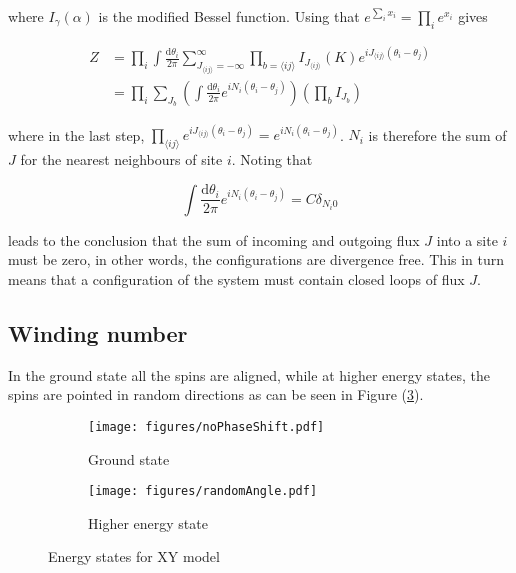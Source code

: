 where $I_\gamma(\alpha)$ is the modified Bessel function. Using that $e^{\sum_i x_i} = \prod_i e^{x_i}$ gives

\begin{align}
    Z &= \prod_i \int \frac{\mathrm d \theta_i}{2 \pi} \sum_{J_{\langle ij \rangle} = -\infty}^{\infty} \prod_{b = \langle ij \rangle} I_{J_{\langle ij \rangle}} ( K ) e^{i J_{\langle ij \rangle} (\theta_i - \theta_j)} \\
\label{eq:xypart2}
% 
    &=  \prod_i \sum_{J_b} \left ( \int \frac{\mathrm d \theta_i}{2 \pi} e^{i N_i (\theta_i - \theta_j)} \right ) \left ( \prod_b I_{J_b} \right ) 
\end{align}

where in the last step, $\prod_{\langle ij \rangle} e^{iJ_{\langle ij \rangle} (\theta_i - \theta_j)} = e^{iN_i (\theta_i - \theta_j)}$. $N_i$ is therefore the sum of $J$ for the nearest neighbours of site $i$. Noting that

\begin{equation}
    \int \frac{\mathrm d \theta_i}{2 \pi} e^{i N_i (\theta_i - \theta_j)} = C \delta_{N_i 0}
\end{equation}

leads to the conclusion that the sum of incoming and outgoing flux $J$ into a site $i$ must be zero, in other words, the configurations are divergence free. This in turn means that a configuration of the system must contain closed loops of flux $J$.


\subsection{Winding number}
\label{subsec:XYWindingNum}

In the ground state all the spins are aligned, while at higher energy states, the spins are pointed in random directions as can be seen in Figure (\ref{fig:xygroundhigher}).

\begin{figure}[h!]
\centering
    \begin{subfigure}{.4\textwidth}
        \centering
        \texttt{[image: figures/noPhaseShift.pdf]}
        \caption{Ground state}
        \label{fig:xyground}
    \end{subfigure}
    \begin{subfigure}{.4\textwidth}
        \centering
        \texttt{[image: figures/randomAngle.pdf]}
        \caption{Higher energy state}
        \label{fig:xyhigher}
    \end{subfigure}
    \caption{Energy states for XY model}
\label{fig:xygroundhigher}
\end{figure}

